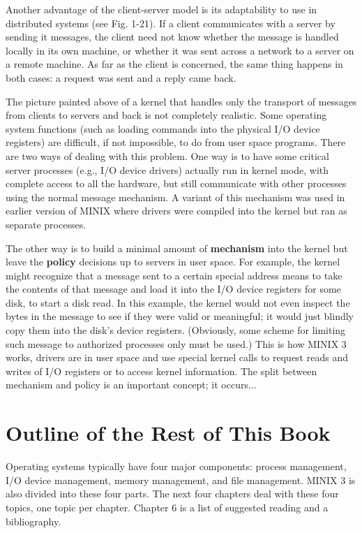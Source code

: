 \documentclass{book}
\newcommand {\kw}  [1] {\textbf{#1}}
\begin{document}
Another advantage of the client-server model is its adaptability to use in distributed systems (see Fig. 1-21).
If a client communicates with a server by sending it messages, 
the client need not know whether the message is handled locally in its own machine,
or whether it was sent across a network to a server on a remote machine.
As far as the client is concerned, the same thing happens in both cases: 
a request was sent and a reply came back.

The picture painted above of a kernel that handles only the transport of messages from clients to servers 
and back is not completely realistic.
Some operating system functions (such as loading commands into the physical I/O device registers) are difficult, 
if not impossible, to do from user space programs.
There are two ways of dealing with this problem.
One way is to have some critical server processes (e.g., I/O device drivers) actually run in kernel mode, 
with complete access to all the hardware, but still communicate with other processes using the normal message mechanism.
A variant of this mechanism was used in earlier version of MINIX where drivers were compiled into the kernel but ran as separate processes.

The other way is to build a minimal amount of \kw{mechanism} into the kernel but leave the \kw{policy} decisions up to servers in user space.
For example, the kernel might recognize that a message sent to a certain special address means to take the contents of that message
and load it into the I/O device registers for some disk, to start a disk read.
In this example, the kernel would not even inspect the bytes in the message to see if they were valid or meaningful;
it would just blindly copy them into the disk's device registers.
(Obviously, some scheme for limiting such message to authorized processes only must be used.)
This is how MINIX 3 works, drivers are in user space and use special kernel calls to request reads and writes of I/O registers or to access kernel information.
The split between mechanism and policy is an important concept; it occurs...

\section{Outline of the Rest of This Book}
Operating systems typically have four major components: 
process management, I/O device management, memory management, and file management.
MINIX 3 is also divided into these four parts.
The next four chapters deal with these four topics, one topic per chapter.
Chapter 6 is a list of suggested reading and a bibliography.
\end{document}
